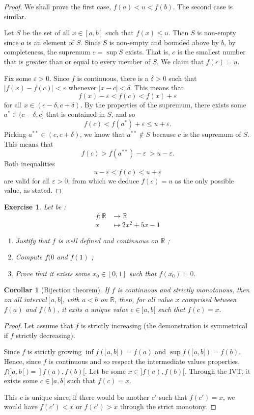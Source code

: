 \documentclass[french,12pt,a4paper]{book}
\newcommand{\R}{\mathbb{R}}
\newtheorem{exo}{Exercise}[chapter]
\newtheorem{cor}{Corollar}[chapter]
\numberwithin{equation}{chapter}
\begin{document}
\begin{proof}
We shall prove the first case, $f(a)<u<f(b)$. The second case is similar.

Let $S$ be the set of all $x\in[a,b]$ such that $f(x)\leq u$. Then $S$ is non-empty since $a$ is an element of $S$. Since $S$ is non-empty and bounded above by $b$, by completeness, the supremum $c=\sup S$ exists. That is, $c$ is the smallest number that is greater than or equal to every member of $S$. We claim that $f(c)=u$.

Fix some $\varepsilon > 0$. Since $f$ is continuous, there is a $\delta>0$ such that $|f(x) - f(c)| < \varepsilon$ whenever $|x-c| < \delta$. This means that
$$f(x)-\varepsilon<f(c)<f(x)+\varepsilon$$
for all $x\in(c-\delta,c+\delta)$. By the properties of the supremum, there exists some $a^*\in (c-\delta,c]$ that is contained in $S$, and so
$$f(c)<f(a^*)+\varepsilon\le u+\varepsilon .$$
Picking $a^{**}\in(c,c+\delta)$, we know that $a^{**}\not\in S$ because $c$ is the supremum of $S$. This means that
$$f(c)>f(a^{**})-\varepsilon\ > u-\varepsilon .$$
Both inequalities
$$u-\varepsilon<f(c)< u+\varepsilon$$
are valid for all $\varepsilon>0$, from which we deduce $f(c)=u$ as the only possible value, as stated.
\end{proof}

\begin{exo}
\label{exoTVI}
Let be :
\begin{align*}
f : \R &\rightarrow \R \\
x &\longmapsto 2x^2 + 5x -1
\end{align*}
\begin{enumerate}
\item Justify that $f$ is well defined and continuous on $\R$ ;
\item Compute $f(0$ and $f(1)$ ;
\item Prove that it exists some $x_0 \in [0,1]$ such that $f(x_0) = 0$.
\end{enumerate}
\end{exo}

\begin{cor}[Bijection theorem]
If $f$ is continuous and strictly monotonous, then on all interval $]a,b[$, with $a < b$ on $\overline{\R}$, then, for all value $x$ comprised between $f(a)$ and $f(b)$, it exits a unique value $c \in ]a, b[$ such that $f(c) = x$. 
\end{cor}

\begin{proof}
Let assume that $f$ is strictly increasing (the demonstration is symmetrical if $f$ strictly decreasing). 

Since $f$ is strictly growing $\inf f(]a,b[) = f(a)$ and $\sup  f(]a,b[) = f(b)$. Hence, since $f$ is continuous and so respect the intermediate values properties, $f(]a,b[) = ]f(a), f(b)[$. Let be some $x \in ]f(a), f(b)[$. Through the IVT, it exists some $c \in ]a, b[$ such that $f(c) = x$. 

This $c$ is unique since, if there would be another $c'$ such that $f(c') = x$, we would have $f(c') < x$ or  $f(c') > x$ through the strict monotony.
\end{proof}
\end{document}
